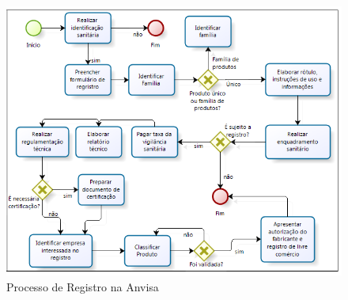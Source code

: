 \begin{figure}[htb]
		\centering
			\includegraphics[scale=0.9]{figuras/processoregistro.png}
		\caption{Processo de Registro na Anvisa}
		\label{registro}
\end{figure}


